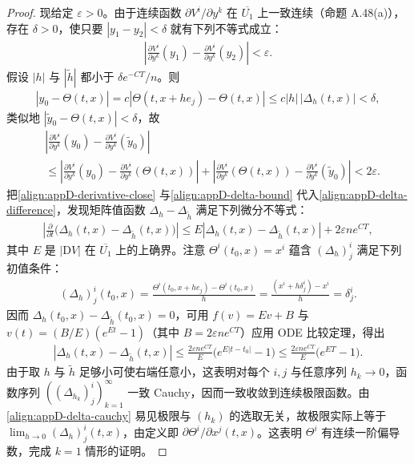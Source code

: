 \documentclass[../../main.tex]{subfiles}
\begin{document}
\begin{proof}
现给定 $\varepsilon>0$。由于连续函数 $\partial V^i/\partial y^k$ 在 $\overline{U_1}$ 上一致连续（命题 A.48(a)），存在 $\delta>0$，使只要 $|y_1-y_2|<\delta$ 就有下列不等式成立：
\begin{align*}
\left|\frac{\partial V^i}{\partial y^k}(y_1)-\frac{\partial V^i}{\partial y^k}(y_2)\right|<\varepsilon.
\end{align*}
假设 $|h|$ 与 $|\widetilde h|$ 都小于 $\delta e^{-CT}/n$。则
\begin{align}\label{align:appD-y0-close}
|y_0-\Theta(t,x)|=c|\Theta(t,x+he_j)-\Theta(t,x)|\leqslant c|h|\,|\Delta_h(t,x)|<\delta,
\end{align}
类似地 $|\widetilde y_0-\Theta(t,x)|<\delta$，故
\begin{align}\label{align:appD-derivative-close}
&\left|\frac{\partial V^i}{\partial y^k}(y_0)-\frac{\partial V^i}{\partial y^k}(\widetilde y_0)\right|\\
&\leqslant\left|\frac{\partial V^i}{\partial y^k}(y_0)-\frac{\partial V^i}{\partial y^k}(\Theta(t,x))\right|
+\left|\frac{\partial V^i}{\partial y^k}(\Theta(t,x))-\frac{\partial V^i}{\partial y^k}(\widetilde y_0)\right|<2\varepsilon.\nonumber
\end{align}
把\eqref{align:appD-derivative-close} 与\eqref{align:appD-delta-bound} 代入\eqref{align:appD-delta-difference}，发现矩阵值函数 $\Delta_h-\Delta_{\widetilde h}$ 满足下列微分不等式：
\begin{align*}
\left|\frac{\partial}{\partial t}\big(\Delta_h(t,x)-\Delta_{\widetilde h}(t,x)\big)\right|
\leqslant E|\Delta_h(t,x)-\Delta_{\widetilde h}(t,x)|+2\varepsilon ne^{CT},
\end{align*}
其中 $E$ 是 $|\mathrm{D}V|$ 在 $\overline{U_1}$ 上的上确界。注意 $\Theta^i(t_0,x)=x^i$ 蕴含 $(\Delta_h)^i_j$ 满足下列初值条件：
\begin{align}\label{align:appD-delta-initial}
(\Delta_h)^i_j(t_0,x)=\frac{\Theta^i(t_0,x+he_j)-\Theta^i(t_0,x)}{h}
=\frac{(x^i+h\delta^i_j)-x^i}{h}=\delta^i_j.
\end{align}
因而 $\Delta_h(t_0,x)-\Delta_{\widetilde h}(t_0,x)=0$，可用 $f(v)=Ev+B$ 与 $v(t)=(B/E)(e^{Et}-1)$（其中 $B=2\varepsilon ne^{CT}$）应用 ODE 比较定理，得出
\begin{align}\label{align:appD-delta-cauchy}
|\Delta_h(t,x)-\Delta_{\widetilde h}(t,x)|
\leqslant\frac{2\varepsilon ne^{CT}}{E}\big(e^{E|t-t_0|}-1\big)
\leqslant\frac{2\varepsilon ne^{CT}}{E}\big(e^{ET}-1\big).
\end{align}
由于取 $h$ 与 $\widetilde h$ 足够小可使右端任意小，这表明对每个 $i,j$ 与任意序列 $h_k\to0$，函数序列 $((\Delta_{h_k})^i_j)_{k=1}^\infty$ 一致 Cauchy，因而一致收敛到连续极限函数。由\eqref{align:appD-delta-cauchy} 易见极限与 $(h_k)$ 的选取无关，故极限实际上等于 $\lim_{h\to0}(\Delta_h)^i_j(t,x)$，由定义即 $\partial\Theta^i/\partial x^j(t,x)$。这表明 $\Theta^i$ 有连续一阶偏导数，完成 $k=1$ 情形的证明。


\end{proof}
\end{document}
